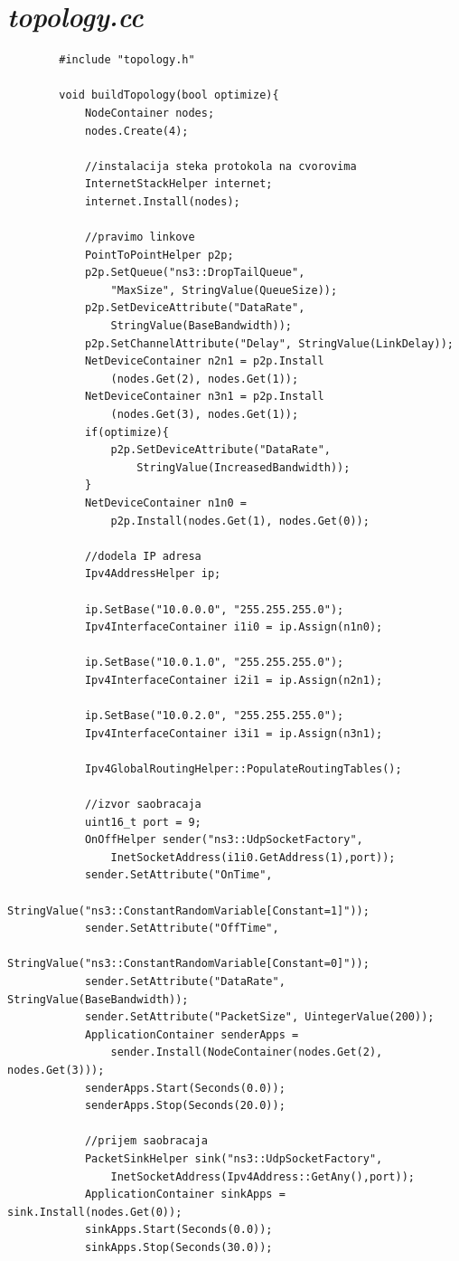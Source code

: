\documentclass[a4paper, 12pt, projekat]{etf}
\begin{document}
	\section*{\emph{topology.cc}}
	\begin{verbatim}
		#include "topology.h"
		
		void buildTopology(bool optimize){
			NodeContainer nodes;
			nodes.Create(4);
			
			//instalacija steka protokola na cvorovima
			InternetStackHelper internet;
			internet.Install(nodes);
			
			//pravimo linkove
			PointToPointHelper p2p;
			p2p.SetQueue("ns3::DropTailQueue", 
			    "MaxSize", StringValue(QueueSize));
			p2p.SetDeviceAttribute("DataRate", 
			    StringValue(BaseBandwidth));
			p2p.SetChannelAttribute("Delay", StringValue(LinkDelay));
			NetDeviceContainer n2n1 = p2p.Install
			    (nodes.Get(2), nodes.Get(1));
			NetDeviceContainer n3n1 = p2p.Install
			    (nodes.Get(3), nodes.Get(1));
			if(optimize){
				p2p.SetDeviceAttribute("DataRate",
				    StringValue(IncreasedBandwidth));
			}
			NetDeviceContainer n1n0 = 
			    p2p.Install(nodes.Get(1), nodes.Get(0));
			
			//dodela IP adresa
			Ipv4AddressHelper ip;
			
			ip.SetBase("10.0.0.0", "255.255.255.0");
			Ipv4InterfaceContainer i1i0 = ip.Assign(n1n0);
			
			ip.SetBase("10.0.1.0", "255.255.255.0");
			Ipv4InterfaceContainer i2i1 = ip.Assign(n2n1);
			
			ip.SetBase("10.0.2.0", "255.255.255.0");
			Ipv4InterfaceContainer i3i1 = ip.Assign(n3n1);
			
			Ipv4GlobalRoutingHelper::PopulateRoutingTables();
			
			//izvor saobracaja
			uint16_t port = 9;
			OnOffHelper sender("ns3::UdpSocketFactory", 
			    InetSocketAddress(i1i0.GetAddress(1),port));
			sender.SetAttribute("OnTime", 
			    StringValue("ns3::ConstantRandomVariable[Constant=1]"));
			sender.SetAttribute("OffTime", 
			    StringValue("ns3::ConstantRandomVariable[Constant=0]"));
			sender.SetAttribute("DataRate", StringValue(BaseBandwidth));
			sender.SetAttribute("PacketSize", UintegerValue(200));
			ApplicationContainer senderApps = 
			    sender.Install(NodeContainer(nodes.Get(2), nodes.Get(3)));
			senderApps.Start(Seconds(0.0));
			senderApps.Stop(Seconds(20.0));
			
			//prijem saobracaja
			PacketSinkHelper sink("ns3::UdpSocketFactory",
			    InetSocketAddress(Ipv4Address::GetAny(),port));
			ApplicationContainer sinkApps = sink.Install(nodes.Get(0));
			sinkApps.Start(Seconds(0.0));
			sinkApps.Stop(Seconds(30.0));
			

\end{verbatim}
\end{document}

